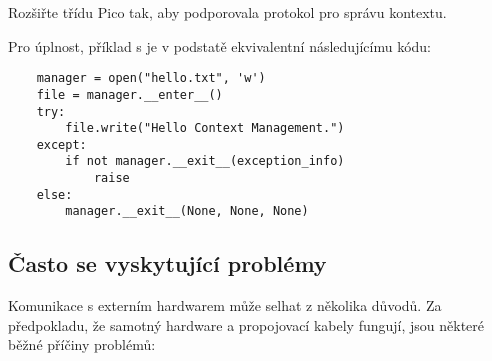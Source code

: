 \begin{exercise}
    Rozšiřte třídu Pico tak, aby podporovala protokol pro správu kontextu.
\end{exercise}

Pro úplnost, příklad s  je v podstatě ekvivalentní následujícímu kódu:
\begin{lstlisting}
    manager = open("hello.txt", 'w')
    file = manager.__enter__()
    try:
        file.write("Hello Context Management.")
    except:
        if not manager.__exit__(exception_info)
            raise
    else:
        manager.__exit__(None, None, None)
\end{lstlisting}

\subsection{Často se vyskytující problémy}
Komunikace s externím hardwarem může selhat z několika důvodů. Za předpokladu, že samotný hardware a propojovací kabely fungují, jsou některé běžné příčiny problémů:
